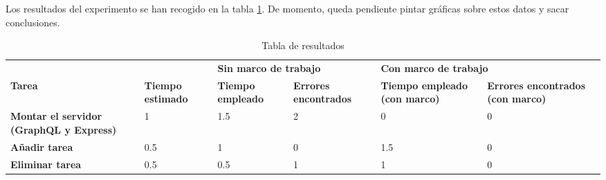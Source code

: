 Los resultados del experimento se han recogido en la tabla \cref{tab:results}. De momento, queda pendiente pintar gráficas sobre estos datos y sacar conclusiones.

\begin{table}[]
\centering
\caption{Tabla de resultados}
\label{tab:results}
\begin{adjustbox}{width=\columnwidth,center}
\begin{tabular}{llllll}
{\color[HTML]{000000} }                                                & {\color[HTML]{000000} }                         & \multicolumn{2}{l}{{\color[HTML]{000000} \textbf{Sin marco de trabajo}}}                              & \multicolumn{2}{l}{{\color[HTML]{000000} \textbf{Con marco de trabajo}}}                                                      \\
{\color[HTML]{000000} \textbf{Tarea}}                                  & {\color[HTML]{000000} \textbf{Tiempo estimado}} & {\color[HTML]{000000} \textbf{Tiempo empleado}} & {\color[HTML]{000000} \textbf{Errores encontrados}} & {\color[HTML]{000000} \textbf{Tiempo empleado (con marco)}} & {\color[HTML]{000000} \textbf{Errores encontrados (con marco)}} \\
{\color[HTML]{000000} \textbf{Montar el servidor (GraphQL y Express)}} & {\color[HTML]{000000} 1}                        & {\color[HTML]{000000} 1.5}                      & {\color[HTML]{000000} 2}                            & {\color[HTML]{000000} 0}                                    & {\color[HTML]{000000} 0}                                        \\
{\color[HTML]{000000} \textbf{Añadir tarea}}                           & {\color[HTML]{000000} 0.5}                      & {\color[HTML]{000000} 1}                        & {\color[HTML]{000000} 0}                            & {\color[HTML]{000000} 1.5}                                  & {\color[HTML]{000000} 0}                                        \\
{\color[HTML]{000000} \textbf{Eliminar tarea}}                         & {\color[HTML]{000000} 0.5}                      & {\color[HTML]{000000} 0.5}                      & {\color[HTML]{000000} 1}                            & {\color[HTML]{000000} 1}                                    & {\color[HTML]{000000} 0}                                        \\

\end{tabular}
\end{adjustbox}
\end{table}
